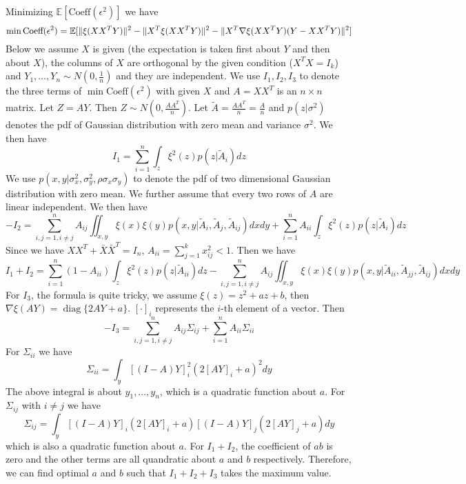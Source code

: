 \documentclass{article}
\DeclarePairedDelimiter\norm{\lVert}{\rVert}
\def\E{\mathbb{E}}
\DeclareMathOperator*{\diag}{diag}
\begin{document}
Minimizing $\E[\textrm{Coeff}(\epsilon^2)]$ we have
\begin{equation}
\min \textrm{Coeff}(\epsilon^2) = \E[\norm{\xi(XX^TY)}^2 - \norm{X^T\xi(XX^TY)}^2 - \norm{X^T \nabla\xi(XX^TY)(Y-XX^TY)}^2]
\end{equation}
Below we assume $X$ is given (the expectation is taken first about $Y$ and then about $X$), the columns of $X$ are orthogonal by the given condition ($X^TX=I_k$) and $Y_1, \dots, Y_n  \sim N(0, \frac{1}{n})$ and they are independent. We use $I_1, I_2, I_3$ to denote the three terms of $\min \textrm{Coeff}(\epsilon^2)$ with given $X$ and $A=XX^T$ is an $n\times n$ matrix. Let $Z = AY$. Then $Z \sim N(0, \frac{AA^T}{n})$. Let $\widetilde{A} = \frac{AA^T}{n} = \frac{A}{n}$ and $p(z| \sigma^2)$ denotes the pdf of Gaussian distribution with zero mean and variance $\sigma^2$. We then have
\begin{equation*}
I_1 = \sum_{i=1}^n \int_z \xi^2(z) p(z| \widetilde{A}_{i}) dz
\end{equation*}
We use $p(x,y | \sigma^2_x, \sigma^2_y, \rho \sigma_x \sigma_y)$ to denote the pdf of two dimensional Gaussian distribution with zero mean. 
We further assume that every two rows of $A$ are linear independent.
We then have
\begin{equation*}
-I_2   = \sum_{i,j=1, i \neq j}^n A_{ij} \iint_{x,y} \xi(x)\xi(y) p(x,y| \widetilde{A}_{i}, \widetilde{A}_{j}, \widetilde{A}_{ij}) dx dy + \sum_{i=1}^n A_{ii} \int_z \xi^2(z) p(z | \widetilde{A}_i) dz 
\end{equation*}
Since we have $XX^T + \bar{X}\bar{X}^T = I_n$, $A_{ii} = \sum_{j=1}^k x^2_{ij} < 1$. Then we have
\begin{equation*}
I_1+ I_2 =   \sum_{i=1}^n (1-A_{ii}) \int_z \xi^2(z) p(z | \widetilde{A}_{ii}) dz  - \sum_{i,j=1, i \neq j}^n A_{ij} \iint_{x,y} \xi(x)\xi(y) p(x,y| \widetilde{A}_{ii}, \widetilde{A}_{jj}, \widetilde{A}_{ij}) dx dy
\end{equation*}
For $I_3$, the formula is quite tricky, we assume $\xi(z) = z^2 + a z + b $, then $\nabla \xi (AY) = \diag\{2AY+ a\}$. $[\cdot]_i$ represents the $i$-th element of a vector.
Then
\begin{equation*}
-I_3 = \sum_{i,j=1, i \neq j}^n A_{ij}\Sigma_{ij} + \sum_{i=1}^n A_{ii}\Sigma_{ii}
\end{equation*}
For $\Sigma_{ii}$ we have
\begin{equation*}
\Sigma_{ii} = \int_y [(I - A)Y]^2_i (2[AY]_i + a)^2 dy
\end{equation*}
The above integral is about $y_1, \dots, y_n$, which is a quadratic function about $a$.
For $\Sigma_{ij}$ with $i\neq j$ we have
\begin{equation*}
\Sigma_{ij} = \int_y [(I - A)Y]_i (2[AY]_i + a)[(I - A)Y]_j (2[AY]_j + a) dy
\end{equation*}
which is also a quadratic function about $a$.
For $I_1 + I_2$, the coefficient of $ab$ is zero and the other terms are all quandratic about $a$ and $b$ respectively. Therefore, we can find optimal $a$ and $b$ such that $I_1 + I_2 + I_3$ takes the maximum value.
\end{document}
